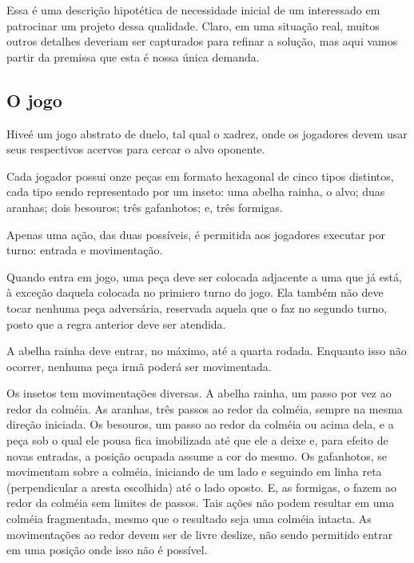   Essa é uma descrição hipotética de necessidade inicial de um interessado em patrocinar um projeto dessa qualidade. Claro, em uma situação real, muitos outros detalhes deveriam ser capturados para refinar a solução, mas aqui vamos partir da premissa que esta é nossa única demanda.

  \subsection{O jogo}

    Hive\footnotemark é um jogo abstrato de duelo, tal qual o xadrez, onde os jogadores devem usar seus respectivos acervos para cercar o alvo oponente.

    Cada jogador possui onze peças em formato hexagonal de cinco tipos distintos, cada tipo sendo representado por um inseto: uma abelha rainha, o alvo; duas aranhas; dois besouros; três gafanhotos; e, três formigas.

    Apenas uma ação, das duas possíveis, é permitida aos jogadores executar por turno: entrada e movimentação.

    Quando entra em jogo, uma peça deve ser colocada adjacente a uma que já está, à exceção daquela colocada no primiero turno do jogo. Ela também não deve tocar nenhuma peça adversária, reservada aquela que o faz no segundo turno, posto que a regra anterior deve ser atendida.

    A abelha rainha deve entrar, no máximo, até a quarta rodada. Enquanto isso não ocorrer, nenhuma peça irmã poderá ser movimentada.

    Os insetos tem movimentações diversas. A abelha rainha, um passo por vez ao redor da colméia. As aranhas, três passos ao redor da colméia, sempre na mesma direção iniciada. Os besouros, um passo ao redor da colméia ou acima dela, e a peça sob o qual ele pousa fica imobilizada até que ele a deixe e, para efeito de novas entradas, a posição ocupada assume a cor do mesmo. Os gafanhotos, se movimentam sobre a colméia, iniciando de um lado e seguindo em linha reta (perpendicular a aresta escolhida) até o lado oposto. E,  as formigas, o fazem ao redor da colméia sem limites de passos. Tais ações não podem resultar em uma colméia fragmentada, mesmo que o resultado seja uma colméia intacta. As movimentações ao redor devem ser de livre deslize, não sendo permitido entrar em uma posição onde isso não é possível.

